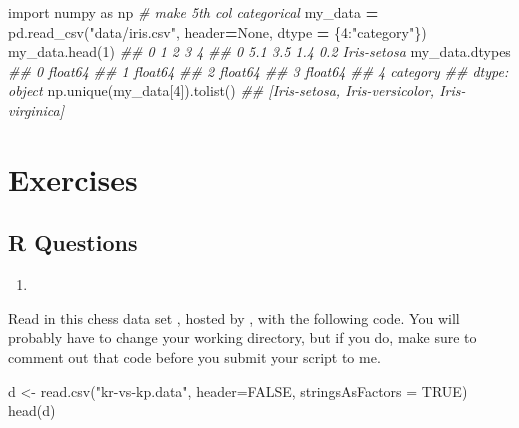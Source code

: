 \documentclass[
  12pt,
  krantz2]{krantz}
\makeatletter
\newenvironment{Shaded}{\begin{snugshade}}{\end{snugshade}}
\newcommand{\AttributeTok}[1]{\textcolor[rgb]{0.61,0.61,0.61}{#1}}
\newcommand{\CommentTok}[1]{\textcolor[rgb]{0.37,0.37,0.37}{\textit{#1}}}
\newcommand{\ConstantTok}[1]{\textcolor[rgb]{0,0,0}{#1}}
\newcommand{\DecValTok}[1]{\textcolor[rgb]{0.06,0.06,0.06}{#1}}
\newcommand{\FunctionTok}[1]{\textcolor[rgb]{0,0,0}{#1}}
\newcommand{\ImportTok}[1]{#1}
\newcommand{\NormalTok}[1]{#1}
\newcommand{\OperatorTok}[1]{\textcolor[rgb]{0.43,0.43,0.43}{\textbf{#1}}}
\newcommand{\OtherTok}[1]{\textcolor[rgb]{0.37,0.37,0.37}{#1}}
\newcommand{\StringTok}[1]{\textcolor[rgb]{0.5,0.5,0.5}{#1}}
\newcommand{\VariableTok}[1]{\textcolor[rgb]{0,0,0}{#1}}
\providecommand{\tightlist}{%
  \setlength{\itemsep}{0pt}\setlength{\parskip}{0pt}}
\newenvironment{kframe}{%
\medskip{}
\setlength{\fboxsep}{.8em}
 \def\at@end@of@kframe{}%
 \ifinner\ifhmode%
  \def\at@end@of@kframe{\end{minipage}}%
  \begin{minipage}{\columnwidth}%
 \fi\fi%
 \def\FrameCommand##1{\hskip\@totalleftmargin \hskip-\fboxsep
 \colorbox{shadecolor}{##1}\hskip-\fboxsep
     \hskip-\linewidth \hskip-\@totalleftmargin \hskip\columnwidth}%
 \MakeFramed {\advance\hsize-\width
   \@totalleftmargin\z@ \linewidth\hsize
   \@setminipage}}%
 {\par\unskip\endMakeFramed%
 \at@end@of@kframe}
\renewenvironment{Shaded}{\begin{kframe}}{\end{kframe}}
\makeatother
\begin{document}
\begin{Shaded}
\begin{Highlighting}[]
\ImportTok{import}\NormalTok{ numpy }\ImportTok{as}\NormalTok{ np}
\CommentTok{\# make 5th col categorical}
\NormalTok{my\_data }\OperatorTok{=}\NormalTok{ pd.read\_csv(}\StringTok{"data/iris.csv"}\NormalTok{, header}\OperatorTok{=}\VariableTok{None}\NormalTok{, }
\NormalTok{                        dtype }\OperatorTok{=}\NormalTok{ \{}\DecValTok{4}\NormalTok{:}\StringTok{"category"}\NormalTok{\}) }
\NormalTok{my\_data.head(}\DecValTok{1}\NormalTok{)}
\CommentTok{\#\#      0    1    2    3            4}
\CommentTok{\#\# 0  5.1  3.5  1.4  0.2  Iris{-}setosa}
\NormalTok{my\_data.dtypes}
\CommentTok{\#\# 0     float64}
\CommentTok{\#\# 1     float64}
\CommentTok{\#\# 2     float64}
\CommentTok{\#\# 3     float64}
\CommentTok{\#\# 4    category}
\CommentTok{\#\# dtype: object}
\NormalTok{np.unique(my\_data[}\DecValTok{4}\NormalTok{]).tolist()}
\CommentTok{\#\# [\textquotesingle{}Iris{-}setosa\textquotesingle{}, \textquotesingle{}Iris{-}versicolor\textquotesingle{}, \textquotesingle{}Iris{-}virginica\textquotesingle{}]}
\end{Highlighting}
\end{Shaded}

\hypertarget{exercises-5}{%
\section{Exercises}\label{exercises-5}}

\hypertarget{r-questions-5}{%
\subsection{R Questions}\label{r-questions-5}}

\begin{enumerate}
\def\labelenumi{\arabic{enumi}.}
\tightlist
\item
\end{enumerate}

Read in this chess data set \citep{misc_chess}, hosted by \citep{uci_data}, with the following code. You will probably have to change your working directory, but if you do, make sure to comment out that code before you submit your script to me.

\begin{Shaded}
\begin{Highlighting}[]
\NormalTok{d }\OtherTok{\textless{}{-}} \FunctionTok{read.csv}\NormalTok{(}\StringTok{"kr{-}vs{-}kp.data"}\NormalTok{, }\AttributeTok{header=}\ConstantTok{FALSE}\NormalTok{, }\AttributeTok{stringsAsFactors =} \ConstantTok{TRUE}\NormalTok{)}
\FunctionTok{head}\NormalTok{(d)}
\end{Highlighting}
\end{Shaded}
\end{document}
